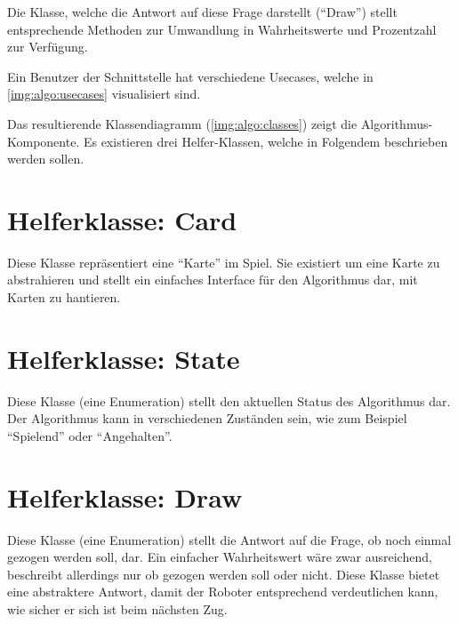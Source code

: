     Die Klasse, welche die Antwort auf diese Frage darstellt (``Draw'') stellt
    entsprechende Methoden zur Umwandlung in Wahrheitswerte und Prozentzahl
    zur Verfügung.

    Ein Benutzer der Schnittstelle hat verschiedene Usecases, welche in
    \autoref{img:algo:usecases} visualisiert sind.

    Das resultierende Klassendiagramm (\autoref{img:algo:classes}) zeigt die
    Algorithmus-Komponente.
    Es existieren drei Helfer-Klassen, welche in Folgendem beschrieben werden
    sollen.

    \section{Helferklasse: Card}

        Diese Klasse repräsentiert eine ``Karte'' im Spiel.
        Sie existiert um eine Karte zu abstrahieren und stellt ein einfaches
        Interface für den Algorithmus dar, mit Karten zu hantieren.

    \section{Helferklasse: State}

        Diese Klasse (eine Enumeration) stellt den aktuellen Status des
        Algorithmus dar.
        Der Algorithmus kann in verschiedenen Zuständen sein, wie zum Beispiel
        ``Spielend'' oder ``Angehalten''.

    \section{Helferklasse: Draw}

        Diese Klasse (eine Enumeration) stellt die Antwort auf die Frage, ob
        noch einmal gezogen werden soll, dar.
        Ein einfacher Wahrheitswert wäre zwar ausreichend, beschreibt allerdings
        nur ob gezogen werden soll oder nicht.
        Diese Klasse bietet eine abstraktere Antwort, damit der Roboter
        entsprechend verdeutlichen kann, wie sicher er sich ist beim nächsten
        Zug.

